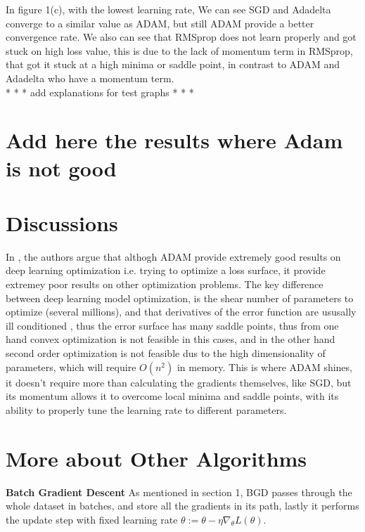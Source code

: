 \documentclass[10pt,a4paper]{article}
\begin{document}
In figure 1(c), with the lowest learning rate, We can see SGD and Adadelta converge to a similar value as ADAM, but still ADAM provide a better convergence rate. We also can see that RMSprop does not learn properly and got stuck on high loss value, this is due to the lack of momentum term in RMSprop, that got it stuck at a high minima or saddle point, in contrast to ADAM and Adadelta who have a momentum term.\\

*
*
* add explanations for test graphs 
*
*
*\\

\section*{Add here the results where Adam is not good}

\section{Discussions}
In \cite{vaswani2019painless}, the authors argue that althogh ADAM provide extremely good results on deep learning optimization i.e. trying to optimize a loss surface, it provide extremey poor results on other optimization problems.
The key difference between deep learning model optimization, is the shear number of parameters to optimize (several millions), and that derivatives of the error function are ususally ill conditioned \cite{li2017visualizing}, thus the error surface has many saddle points, thus from one hand convex optimization is not feasible in this cases, and in the other hand second order optimization is not feasible dus to the high dimensionality of parameters, which will require $O(n^2)$ in memory. This is where ADAM shines, it doesn't require more than calculating the gradients themselves, like SGD, but its momentum allows it to overcome local minima and saddle points, with its ability to properly tune the learning rate to different parameters.














\section{More about Other Algorithms}
\textbf{Batch Gradient Descent} As mentioned in section 1, BGD passes through the whole dataset in batches, and store all the gradients in its path, lastly it performs the update step with fixed learning rate $\theta:=\theta-\eta \nabla_\theta L(\theta)$. \\
\end{document}
